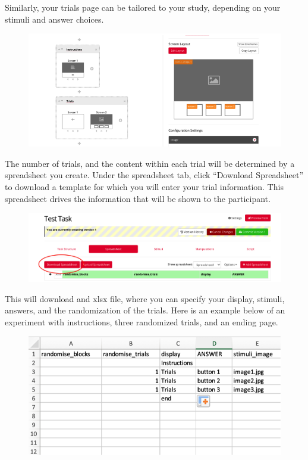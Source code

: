 \documentclass[]{book}
\begin{document}
Similarly, your trials page can be tailored to your study, depending on your stimuli and answer choices.

\begin{figure}
\centering
\includegraphics{images/research_protocols/gorilla/gorilla20.png}
\caption{}
\end{figure}

The number of trials, and the content within each trial will be determined by a spreadsheet you create. Under the spreadsheet tab, click ``Download Spreadsheet'' to download a template for which you will enter your trial information. This spreadsheet drives the information that will be shown to the participant.

\begin{figure}
\centering
\includegraphics{images/research_protocols/gorilla/gorilla21.png}
\caption{}
\end{figure}

This will download and xlsx file, where you can specify your display, stimuli, answers, and the randomization of the trials. Here is an example below of an experiment with instructions, three randomized trials, and an ending page.

\begin{figure}
\centering
\includegraphics{images/research_protocols/gorilla/gorilla22.png}
\caption{}
\end{figure}
\end{document}
